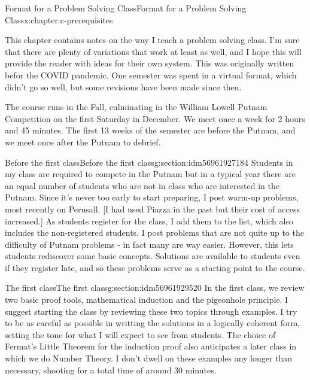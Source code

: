 \documentclass[twoside,10pt,]{book}
\numberwithin{equation}{section}
\begin{document}
\begin{chapterptx}{Format for a Problem Solving Class}{}{Format for a Problem Solving Class}{}{}{x:chapter:c-prerequisites}
\begin{introduction}{}%
This chapter contains notes on the way I teach a problem solving class.  I'm sure that there are plenty of variations that work at least as well, and I hope this will provide the reader with ideas for their own system. This was originally written befor the COVID pandemic.  One semester was spent in a virtual format, which didn't go so well, but some revisions have been made since then.%
\par
The course runs in the Fall, culminating in the William Lowell Putnam Competition on the first Saturday in December.  We meet once a week for 2 hours and 45 minutes.  The first 13 weeks of the semester are before the Putnam, and we meet once after the Putnam to debrief.%
\end{introduction}%
%
%
\typeout{************************************************}
\typeout{************************************************}
%
\begin{sectionptx}{Before the first class}{}{Before the first class}{}{}{g:section:idm56961927184}
Students in my class are required to compete in the Putnam but in a typical year there are an equal number of students who are not in class who are interested in the Putnam.  Since it's never too early to start preparing, I post warm-up problems, most recently on Perusall. [I had used Piazza in the past but their cost of access increased.]  As students register for the class, I add them to the list, which also includes the non-registered students.  I post problems that are not quite up to the difficulty of Putnam problems - in fact many are way easier.  However, this lets students rediscover some basic concepts.  Solutions are available to students even if they register late, and so these problems serve as a starting point to the course.%
\end{sectionptx}
%
%
\typeout{************************************************}
\typeout{************************************************}
%
\begin{sectionptx}{The first class}{}{The first class}{}{}{g:section:idm56961929520}
In the first class, we review two basic proof tools, mathematical induction and the pigeonhole principle. I suggest starting the class by reviewing these two topics through examples.  I try to be as careful as possible in writting the solutions in a logically coherent form, setting the tone for what I will expect to see from students.   The choice of Fermat's Little Theorem for the induction proof also anticipates a later class in which we do Number Theory.  I don't dwell on these examples any longer than necessary, shooting for a total time of around 30 minutes.%

\end{sectionptx}
\end{chapterptx}
\end{document}
